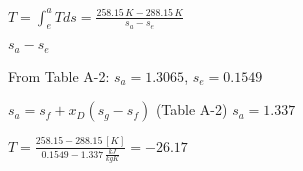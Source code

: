 \( T = \int_e^a T ds = \frac{258.15 \, K - 288.15 \, K}{s_a - s_e} \)  

\( s_a - s_e \)  

From Table A-2:  
\( s_a = 1.3065 \), \( s_e = 0.1549 \)  

\( s_a = s_f + x_D (s_g - s_f) \) (Table A-2)  
\( s_a = 1.337 \)  

\( T = \frac{258.15 - 288.15 \, [K]}{0.1549 - 1.337 \, \frac{kJ}{kgK}} = -26.17 \)